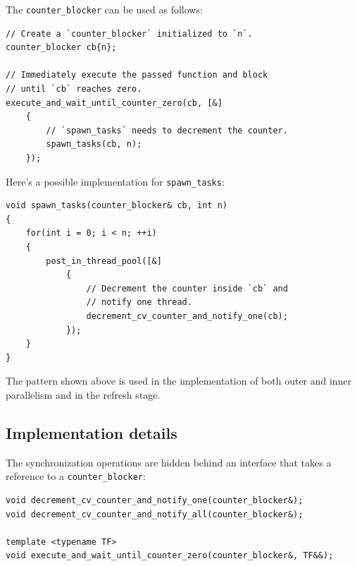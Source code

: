 \documentclass[twoside, 12pt, a4paper, openright]{book}
\begin{document}
The
\texttt{counter_blocker}
can be used as follows:

\begin{verbatim}
// Create a `counter_blocker` initialized to `n`.
counter_blocker cb{n};

// Immediately execute the passed function and block
// until `cb` reaches zero.
execute_and_wait_until_counter_zero(cb, [&]
    {
        // `spawn_tasks` needs to decrement the counter.
        spawn_tasks(cb, n);
    });
\end{verbatim}

Here's a possible implementation for
\texttt{spawn_tasks}:

\begin{verbatim}
void spawn_tasks(counter_blocker& cb, int n)
{
    for(int i = 0; i < n; ++i)
    {
        post_in_thread_pool([&]
            {
                // Decrement the counter inside `cb` and
                // notify one thread.
                decrement_cv_counter_and_notify_one(cb);
            });
    }
}
\end{verbatim}

The pattern shown above is used in the implementation of both outer and
inner parallelism and in the refresh stage.

\subsection{Implementation details}\label{implementation-details}

The synchronization operations are hidden behind an interface that takes
a reference to a
\texttt{counter_blocker}:

\begin{verbatim}
void decrement_cv_counter_and_notify_one(counter_blocker&);
void decrement_cv_counter_and_notify_all(counter_blocker&);

template <typename TF>
void execute_and_wait_until_counter_zero(counter_blocker&, TF&&);
\end{verbatim}
\end{document}
